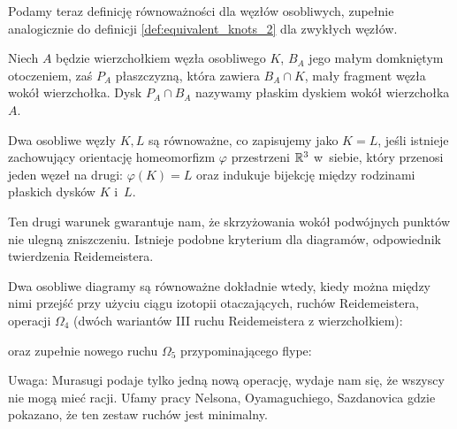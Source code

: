 Podamy teraz definicję równoważności dla węzłów osobliwych, zupełnie analogicznie do definicji \ref{def:equivalent_knots_2} dla zwykłych węzłów.

\begin{definition}
    Niech $A$ będzie wierzchołkiem węzła osobliwego $K$, $B_A$ jego małym domkniętym otoczeniem, zaś $P_A$ płaszczyzną, która zawiera $B_A \cap K$, mały fragment węzła wokół wierzchołka.
    Dysk $P_A \cap B_A$ nazywamy płaskim dyskiem wokół wierzchołka $A$.
\end{definition}

\begin{definition}
    Dwa osobliwe węzły $K, L$ są równoważne, co zapisujemy jako $K = L$, jeśli istnieje zachowujący orientację homeomorfizm $\varphi$ przestrzeni $\mathbb R^3$ w~siebie, który przenosi jeden węzeł na drugi: $\varphi(K) = L$ oraz indukuje bijekcję między rodzinami płaskich dysków $K$ i~$L$.
\end{definition}

Ten drugi warunek gwarantuje nam, że skrzyżowania wokół podwójnych punktów nie ulegną zniszczeniu.
Istnieje podobne kryterium dla diagramów, odpowiednik twierdzenia Reidemeistera.

\begin{proposition}
    Dwa osobliwe diagramy są równoważne dokładnie wtedy, kiedy można między nimi przejść przy użyciu ciągu izotopii otaczających, ruchów Reidemeistera, operacji $\Omega_4$ (dwóch wariantów III ruchu Reidemeistera z wierzchołkiem):

    oraz zupełnie nowego ruchu $\Omega_5$ przypominającego flype:

\end{proposition}

Uwaga: Murasugi podaje tylko jedną nową operację, wydaje nam się, że wszyscy nie mogą mieć racji.
Ufamy pracy Nelsona, Oyamaguchiego, Sazdanovica \cite{sazdanovic19} gdzie pokazano, że ten zestaw ruchów jest minimalny.

